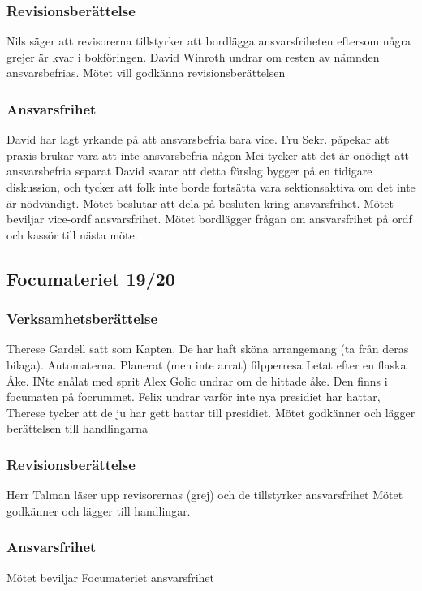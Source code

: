 \documentclass[hidelinks]{../sektionsmote} %
\begin{document}
\subsubsection{Revisionsberättelse}
Nils säger att revisorerna tillstyrker att bordlägga ansvarsfriheten eftersom några grejer är kvar i bokföringen.
David Winroth undrar om resten av nämnden ansvarsbefrias.
Mötet vill godkänna revisionsberättelsen

\subsubsection{Ansvarsfrihet}
David har lagt yrkande på att ansvarsbefria bara vice.
Fru Sekr. påpekar att praxis brukar vara att inte ansvarsbefria någon
Mei tycker att det är onödigt att ansvarsbefria separat
David svarar att detta förslag bygger på en tidigare diskussion, och tycker att folk inte borde fortsätta vara sektionsaktiva om det inte är nödvändigt.
Mötet beslutar att dela på besluten kring ansvarsfrihet.
Mötet beviljar vice-ordf ansvarsfrihet.
Mötet bordlägger frågan om ansvarsfrihet på ordf och kassör till nästa möte.

\subsection{Focumateriet 19/20}

\subsubsection{Verksamhetsberättelse}
Therese Gardell satt som Kapten.
De har haft sköna arrangemang (ta från deras bilaga).
Automaterna.
Planerat (men inte arrat) filpperresa
Letat efter en flaska Åke.
INte snålat med sprit
Alex Golic undrar om de hittade åke. Den finns i focumaten på focrummet.
Felix undrar varför inte nya presidiet har hattar, Therese tycker att de ju har gett hattar till presidiet.
Mötet godkänner och lägger berättelsen till handlingarna

\subsubsection{Revisionsberättelse}
Herr Talman läser upp revisorernas (grej) och de tillstyrker ansvarsfrihet
Mötet godkänner och lägger till handlingar.

\subsubsection{Ansvarsfrihet}
Mötet beviljar Focumateriet ansvarsfrihet
\end{document}
